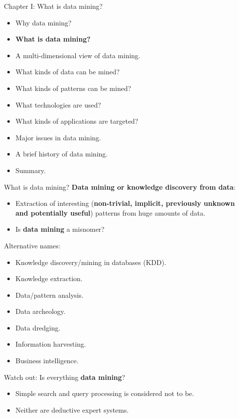 \documentclass[aspectratio=169,t]{beamer}
\begin{document}
  { 
    \begin{frame}{Chapter I: What is data mining?}
        \begin{itemize}
            \item Why data mining?
            \item \textbf{What is data mining?}
            \item A multi-dimensional view of data mining.
            \item What kinds of data can be mined?
            \item What kinds of patterns can be mined?
            \item What technologies are used?
            \item What kinds of applications are targeted?
            \item Major issues in data mining.
            \item A brief history of data mining.
            \item Summary.
        \end{itemize}
    \end{frame}
  }

  { 
    \begin{frame}{What is data mining?}
    \textbf{Data mining or knowledge discovery from data}:
        \begin{itemize}
            \item Extraction of interesting (\textbf{non-trivial, implicit, previously unknown \\
                  and potentially useful}) patterns from huge amounts of data.
            \item Is \textbf{data mining} a misnomer?
        \end{itemize}
    Alternative names:
        \begin{itemize}
            \item Knowledge discovery/mining in databases (KDD).
            \item Knowledge extraction.
            \item Data/pattern analysis.
            \item Data archeology.
            \item Data dredging.
            \item Information harvesting.
            \item Business intelligence.
        \end{itemize}
    Watch out: Is everything \textbf{data mining}?
        \begin{itemize}
            \item Simple search and query processing is considered not to be.
            \item Neither are deductive expert systems.
        \end{itemize}
    \end{frame}
  }
\end{document}

